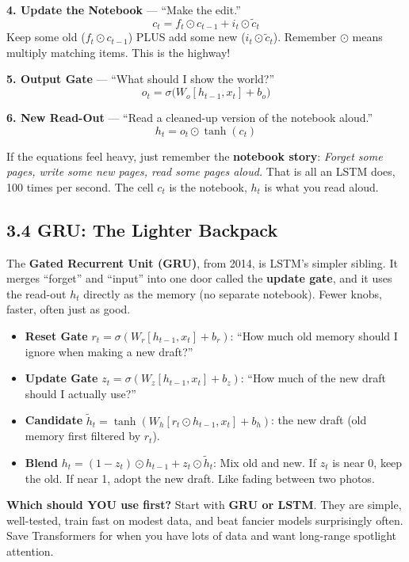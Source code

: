 \documentclass[11pt,a4paper]{article}
\begin{document}
\textbf{4. Update the Notebook} --- ``Make the edit.''
\[
c_t = f_t \odot c_{t-1} + i_t \odot \tilde{c}_t
\]
Keep some old ($f_t \odot c_{t-1}$) PLUS add some new ($i_t \odot \tilde{c}_t$).
Remember $\odot$ means multiply matching items. This is the highway!

\textbf{5. Output Gate} --- ``What should I show the world?''
\[
o_t = \sigma\big( W_o [h_{t-1}, x_t] + b_o \big)
\]

\textbf{6. New Read-Out} --- ``Read a cleaned-up version of the notebook aloud.''
\[
h_t = o_t \odot \tanh(c_t)
\]

\begin{keybox}
If the equations feel heavy, just remember the \textbf{notebook story}:
\emph{Forget some pages, write some new pages, read some pages aloud.} That is
all an LSTM does, 100 times per second. The cell $c_t$ is the notebook, $h_t$
is what you read aloud.
\end{keybox}

\subsection{3.4 GRU: The Lighter Backpack}
\label{sec:gru}

The \textbf{Gated Recurrent Unit (GRU)}, from 2014, is LSTM's simpler sibling.
It merges ``forget'' and ``input'' into one door called the \textbf{update
gate}, and it uses the read-out $h_t$ directly as the memory (no separate
notebook). Fewer knobs, faster, often just as good.

\begin{itemize}[leftmargin=1.6em,itemsep=2pt]
  \item \textbf{Reset Gate} $r_t = \sigma(W_r [h_{t-1}, x_t] + b_r)$:
        ``How much old memory should I ignore when making a new draft?''
  \item \textbf{Update Gate} $z_t = \sigma(W_z [h_{t-1}, x_t] + b_z)$:
        ``How much of the new draft should I actually use?''
  \item \textbf{Candidate}
        $\tilde{h}_t = \tanh(W_h [r_t \odot h_{t-1}, x_t] + b_h)$:
        the new draft (old memory first filtered by $r_t$).
  \item \textbf{Blend}
        $h_t = (1 - z_t) \odot h_{t-1} + z_t \odot \tilde{h}_t$:
        Mix old and new. If $z_t$ is near 0, keep the old. If near 1, adopt the
        new draft. Like fading between two photos.
\end{itemize}

\begin{keybox}
\textbf{Which should YOU use first?} Start with \textbf{GRU or LSTM}. They are
simple, well-tested, train fast on modest data, and beat fancier models surprisingly
often. Save Transformers for when you have lots of data and want long-range
spotlight attention.
\end{keybox}
\end{document}
